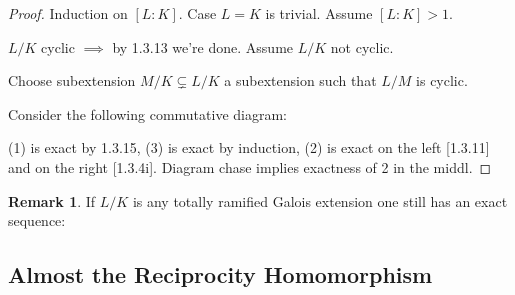 \documentclass{article}
\theoremstyle{definition}
\numberwithin{theorem}{subsection}
\newtheorem*{remark}{Remark}
\begin{document}
    \begin{proof}
        Induction on \([L:K]\). Case \(L = K\) is trivial. Assume \([L:K] > 1\).

        \(L / K\) cyclic \(\implies\) by 1.3.13 we're done. Assume \(L / K\) not cyclic.
        
        Choose subextension \(M / K \subsetneq L / K\) a subextension such that \(L / M\) is cyclic.
        
        Consider the following commutative diagram:

        \begin{center}
        \end{center}
        
        (1) is exact by 1.3.15, (3) is exact by induction, (2) is exact on the left [1.3.11] and on the right [1.3.4i]. Diagram chase implies exactness of 2 in the middl.

    \end{proof}

    \begin{remark}
        If \(L / K\) is any totally ramified Galois extension one still has an exact sequence:

        \begin{center}
        \end{center}
    \end{remark}

    \subsection*{Almost the Reciprocity Homomorphism}
    
\end{document}
